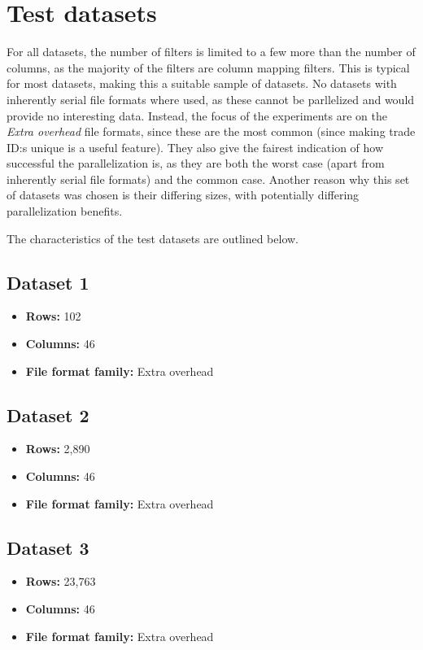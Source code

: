 \section{Test datasets}
For all datasets, the number of filters is limited to a few more than the number of columns, as the majority of the filters are column mapping filters.
This is typical for most datasets, making this a suitable sample of datasets. No datasets with inherently serial file formats where used, as these cannot be
parllelized and would provide no interesting data. Instead, the focus of the experiments are on the \textit{Extra overhead} file formats, since these are the
most common (since making trade ID:s unique is a useful feature). They also give the fairest indication of how successful the parallelization is, as they are
both the worst case (apart from inherently serial file formats) and the common case. Another reason why this set of datasets was chosen is their differing sizes,
with potentially differing parallelization benefits.

The characteristics of the test datasets are outlined below.

\subsection{Dataset 1}
\begin{itemize}
  \item \textbf{Rows:} 102
  \item \textbf{Columns:} 46
  \item \textbf{File format family:} Extra overhead
\end{itemize}

\subsection{Dataset 2}
\begin{itemize}
  \item \textbf{Rows:} 2,890
  \item \textbf{Columns:} 46
  \item \textbf{File format family:} Extra overhead
\end{itemize}

\subsection{Dataset 3}
\begin{itemize}
  \item \textbf{Rows:} 23,763
  \item \textbf{Columns:} 46
  \item \textbf{File format family:} Extra overhead
\end{itemize}

